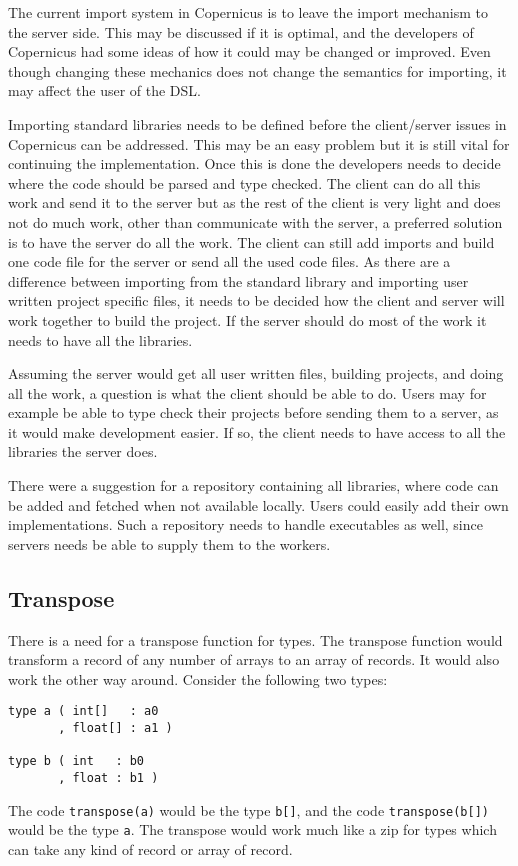 The current import system in Copernicus is to leave the import
mechanism to the server side. This may be discussed if it is optimal,
and the developers of Copernicus had some ideas of how it could may be
changed or improved. Even though changing these mechanics does not
change the semantics for importing, it may affect the user of the DSL.

Importing standard libraries needs to be defined before the
client/server issues in Copernicus can be addressed. This may be an
easy problem but it is still vital for continuing the
implementation. Once this is done the developers needs to decide where
the code should be parsed and type checked. The client can do all this
work and send it to the server but as the rest of the client is very
light and does not do much work, other than communicate with the
server, a preferred solution is to have the server do all the work. The
client can still add imports and build one code file for the server or
send all the used code files. As there are a difference between
importing from the standard library and importing user written project
specific files, it needs to be decided how the client and server will
work together to build the project. If the server should do most of
the work it needs to have all the libraries.

Assuming the server would get all user written files, building
projects, and doing all the work, a question is what the client should
be able to do. Users may for example be able to type check their
projects before sending them to a server, as it would make development
easier. If so, the client needs to have access to all the libraries
the server does.

There were a suggestion for a repository containing all libraries,
where code can be added and fetched when not available locally. Users
could easily add their own implementations. Such a repository needs to
handle executables as well, since servers needs be able to supply them
to the workers.

\subsection{Transpose}
There is a need for a transpose function for types. The transpose
function would transform a record of any number of arrays to an array
of records. It would also work the other way around. Consider the
following two types:

\begin{verbatim}
type a ( int[]   : a0
       , float[] : a1 )

type b ( int   : b0
       , float : b1 )
\end{verbatim}

The code \verb#transpose(a)# would be the type \verb#b[]#, and the
code \verb#transpose(b[])# would be the type \verb#a#. The transpose
would work much like a zip for types which can take any kind of record
or array of record.
